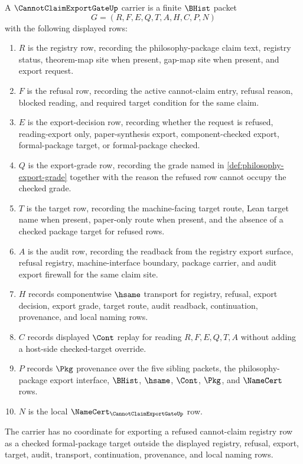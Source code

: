 \begin{definition}
\label{def:cannot-claim-export-gate-carrier}
A $\CannotClaimExportGateUp$ carrier is a finite $\BHist$ packet
$$
G=(R,F,E,Q,T,A,H,C,P,N)
$$
with the following displayed rows:
\begin{enumerate}
\item $R$ is the registry row, recording the philosophy-package claim text, registry status, theorem-map site when present, gap-map site when present, and export request.
\item $F$ is the refusal row, recording the active cannot-claim entry, refusal reason, blocked reading, and required target condition for the same claim.
\item $E$ is the export-decision row, recording whether the request is refused, reading-export only, paper-synthesis export, component-checked export, formal-package target, or formal-package checked.
\item $Q$ is the export-grade row, recording the grade named in \autoref{def:philosophy-export-grade} together with the reason the refused row cannot occupy the checked grade.
\item $T$ is the target row, recording the machine-facing target route, Lean target name when present, paper-only route when present, and the absence of a checked package target for refused rows.
\item $A$ is the audit row, recording the readback from the registry export surface, refusal registry, machine-interface boundary, package carrier, and audit export firewall for the same claim site.
\item $H$ records componentwise $\hsame$ transport for registry, refusal, export decision, export grade, target route, audit readback, continuation, provenance, and local naming rows.
\item $C$ records displayed $\Cont$ replay for reading $R,F,E,Q,T,A$ without adding a host-side checked-target override.
\item $P$ records $\Pkg$ provenance over the five sibling packets, the philosophy-package export interface, $\BHist$, $\hsame$, $\Cont$, $\Pkg$, and $\NameCert$ rows.
\item $N$ is the local $\NameCert_{\CannotClaimExportGateUp}$ row.
\end{enumerate}
The carrier has no coordinate for exporting a refused cannot-claim registry row as a checked formal-package target outside the displayed registry, refusal, export, target, audit, transport, continuation, provenance, and local naming rows.
\end{definition}


